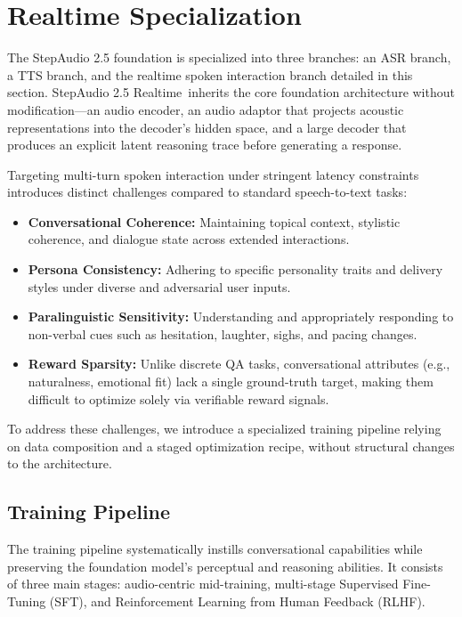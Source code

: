 \documentclass{llmxive}
\providecommand{\steprealtime}{\mbox{StepAudio} 2.5 Realtime}
\begin{document}
\section{Realtime Specialization}
\label{sec:realtime}

The StepAudio 2.5 foundation is specialized into three branches: an ASR branch, a TTS branch, and the realtime spoken interaction branch detailed in this section. \steprealtime\ inherits the core foundation architecture without modification---an audio encoder, an audio adaptor that projects acoustic representations into the decoder's hidden space, and a large decoder that produces an explicit latent reasoning trace before generating a response.

Targeting multi-turn spoken interaction under stringent latency constraints introduces distinct challenges compared to standard speech-to-text tasks:
\begin{itemize}
    \item \textbf{Conversational Coherence:} Maintaining topical context, stylistic coherence, and dialogue state across extended interactions.
    \item \textbf{Persona Consistency:} Adhering to specific personality traits and delivery styles under diverse and adversarial user inputs.
    \item \textbf{Paralinguistic Sensitivity:} Understanding and appropriately responding to non-verbal cues such as hesitation, laughter, sighs, and pacing changes.
    \item \textbf{Reward Sparsity:} Unlike discrete QA tasks, conversational attributes (e.g., naturalness, emotional fit) lack a single ground-truth target, making them difficult to optimize solely via verifiable reward signals.
\end{itemize}
To address these challenges, we introduce a specialized training pipeline relying on data composition and a staged optimization recipe, without structural changes to the architecture.

\subsection{Training Pipeline}
The training pipeline systematically instills conversational capabilities while preserving the foundation model's perceptual and reasoning abilities. It consists of three main stages: audio-centric mid-training, multi-stage Supervised Fine-Tuning (SFT), and Reinforcement Learning from Human Feedback (RLHF).
\end{document}
